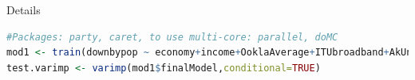 \documentclass{beamer}
\begin{document}
\begin{frame}[fragile]{Details}
\begin{scriptsize}
		\begin{lstlisting}[caption={Regression Analysis with Random Forests in R},label={lst:cForest},language={R},showspaces=false,breaklines=true]
#Packages: party, caret, to use multi-core: parallel, doMC 
mod1 <- train(downbypop ~ economy+income+OoklaAverage+ITUbroadband+AkUniqueIP+AkAverage+AkPeak+AkHighBroadband+AkBroadband+AkNarrowband+DemIndex, data = downdata,method = "cforest",trControl = trainControl(method = "oob",allowParallel = TRUE, number = 10, repeats = 10),controls = cforest_unbiased(ntree = 10000))
test.varimp <- varimp(mod1$finalModel,conditional=TRUE)		
		\end{lstlisting}
		\end{scriptsize}
\end{frame}
\end{document}
